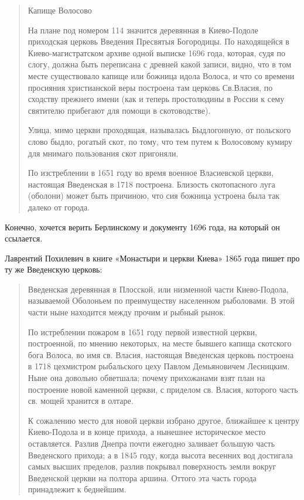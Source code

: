 \begin{quotation}
Капище Волосово\newline

На плане под номером 114 значится деревянная в Киево-Подоле приходская церковь Введения Пресвятыя Богородицы. По находящейся в Киево-магистратском архиве одной выписке 1696 года, которая, судя по слогу, должна быть переписана с древней какой записи, видно, что в том месте существовало капище или божница идола Волоса, и что со времени просияния христианской веры построена там церковь Св.Власия, по сходству прежнего имени (как и теперь простолюдины в России к сему святителю прибегают для помощи в скотоводстве).

Улица, мимо церкви проходящая, называлась Быдлогонную, от польского слово быдло, рогатый скот, по тому, что тем путем к Волосовому кумиру для мнимаго пользования скот пригоняли.

По изстреблении в 1651 году во время военное Власиевской церкви, настоящая Введенская в 1718 построена. Близость скотопасного луга (оболони) может быть причиною, что сия божница устроена была так далеко от города.
\end{quotation}

Конечно, хочется верить Берлинскому и документу 1696 года, на который он ссылается.  

Лаврентий Похилевич в книге «Монастыри и церкви Киева» 1865 года пишет про ту же Введенскую церковь:

\begin{quotation}
Введенская деревянная в Плосской, или низменной части Киево-Подола, называемой Оболоньем по преимуществу населенном рыболовами. В этой части ныне находится между прочим и рыбный рынок.

По истреблении пожаром в 1651 году первой известной церкви, построенной, по мнению некоторых, на месте бывшего капища скотского бога Волоса, во имя св. Власия, настоящая Введенская церковь построена в 1718 цехмистром рыбальского цеху Павлом Демьяновичем Лесницким. Ныне она довольно обветшала; почему прихожанами взят план на построение новой каменной церкви, с приделом св. Власия, которого часть св. мощей хранится в олтаре.

К сожалению место для новой церкви избрано другое, ближайшее к центру Киево-Подола и в конце прихода, а нынешнее историческое место оставляется. Разлив Днепра почти ежегодно заливает большую часть Введенского прихода; а в 1845 году, когда высота весенних вод достигала самых высших пределов, разлив покрывал поверхность земли вокруг Введенской церкви на полтора аршина. Оттого эта часть города принадлежит к беднейшим.
\end{quotation}

